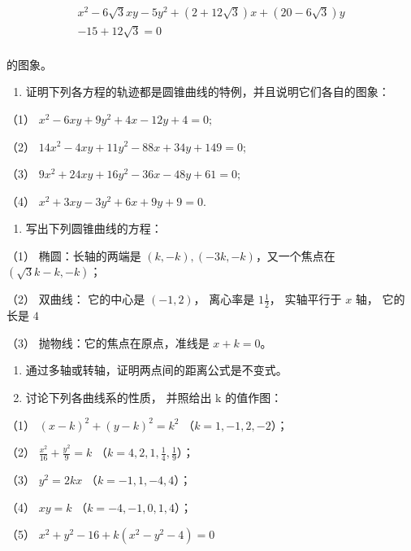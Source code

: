 \[
\begin{array}{l} x^{2} - 6 \sqrt {3} x y - 5 y^{2} + (2 + 12 \sqrt {3}) x + (20 - 6 \sqrt {3}) y \\ - 15 + 12 \sqrt {3} = 0 \\ \end{array}
\]

的图象。

\begin{enumerate}
\def\labelenumi{\arabic{enumi}.}
\setcounter{enumi}{6}
\tightlist
\item
  证明下列各方程的轨迹都是圆锥曲线的特例，并且说明它们各自的图象：
\end{enumerate}

（1） \(x^{2} - 6xy + 9y^{2} + 4x - 12y + 4 = 0;\)

（2） \(14x^{2} - 4xy + 11y^{2} - 88x + 34y + 149 = 0;\)

（3） \(9x^{2} + 24xy + 16y^{2} - 36x - 48y + 61 = 0;\)

（4） \(x^{2} + 3xy - 3y^{2} + 6x + 9y + 9 = 0.\)

\begin{enumerate}
\def\labelenumi{\arabic{enumi}.}
\setcounter{enumi}{7}
\tightlist
\item
  写出下列圆锥曲线的方程：
\end{enumerate}

（1） 椭圆：长轴的两端是 \((k, -k), (-3k, -k)\)，又一个焦点在
\((\sqrt{3} k - k, -k)\)；

（2） 双曲线： 它的中心是 \((-1, 2)\)， 离心率是 \(1 \frac{1}{2}\)，
实轴平行于 \(x\) 轴， 它的长是 \(4\)

（3） 抛物线：它的焦点在原点，准线是 \(x + k = 0\)。

\begin{enumerate}
\def\labelenumi{\arabic{enumi}.}
\setcounter{enumi}{8}
\item
  通过多轴或转轴，证明两点间的距离公式是不变式。
\item
  讨论下列各曲线系的性质， 并照给出 k 的值作图：
\end{enumerate}

（1） \((x - k)^2 + (y - k)^2 = k^2\) （\(k = 1, -1, 2, -2\)）；

（2） \(\frac{x^2}{16} + \frac{y^2}{9} = k\)
（\(k = 4, 2, 1, \frac{1}{4}, \frac{1}{9}\)）；

（3） \(y^{2} = 2kx\) （\(k = -1, 1, -4, 4\)）；

（4） \(xy = k\) （\(k = -4, -1, 0, 1, 4\)）；

（5） \(x^{2} + y^{2} - 16 + k(x^{2} - y^{2} - 4) = 0\)

